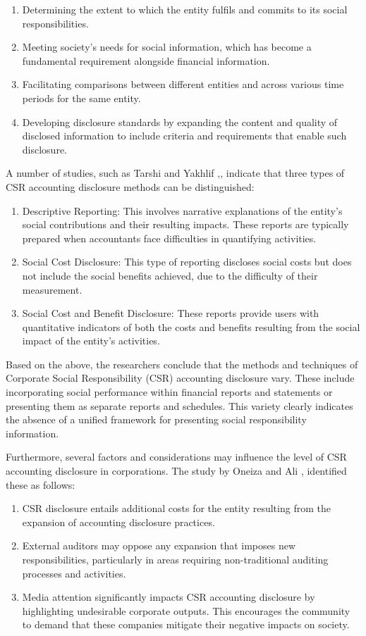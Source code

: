 \documentclass[10pt]{NSP1}
\begin{document}
\begin{enumerate}
  \item Determining the extent to which the entity fulfils and commits to its social responsibilities.
  \item Meeting society's needs for social information, which has become a fundamental requirement alongside financial information.
  \item Facilitating comparisons between different entities and across various time periods for the same entity.
  \item Developing disclosure standards by expanding the content and quality of disclosed information to include criteria and requirements that enable such disclosure.
\end{enumerate}

A number of studies, such as Tarshi and Yakhlif \cite{ref4},, indicate that three types of CSR accounting disclosure methods can be distinguished:

\begin{enumerate}
  \item Descriptive Reporting: This involves narrative explanations of the entity's social contributions and their resulting impacts. These reports are typically prepared when accountants face difficulties in quantifying activities.
  \item Social Cost Disclosure: This type of reporting discloses social costs but does not include the social benefits achieved, due to the difficulty of their measurement.
  \item Social Cost and Benefit Disclosure: These reports provide users with quantitative indicators of both the costs and benefits resulting from the social impact of the entity's activities.
\end{enumerate}

Based on the above, the researchers conclude that the methods and techniques of Corporate Social Responsibility (CSR) accounting disclosure vary. These include incorporating social performance within financial reports and statements or presenting them as separate reports and schedules. This variety clearly indicates the absence of a unified framework for presenting social responsibility information.

Furthermore, several factors and considerations may influence the level of CSR accounting disclosure in corporations. The study by Oneiza and Ali \cite{ref26}, identified these as follows:

\begin{enumerate}
  \item CSR disclosure entails additional costs for the entity resulting from the expansion of accounting disclosure practices.
  \item External auditors may oppose any expansion that imposes new responsibilities, particularly in areas requiring non-traditional auditing processes and activities.
  \item Media attention significantly impacts CSR accounting disclosure by highlighting undesirable corporate outputs. This encourages the community to demand that these companies mitigate their negative impacts on society.
\end{enumerate}
\end{document}
